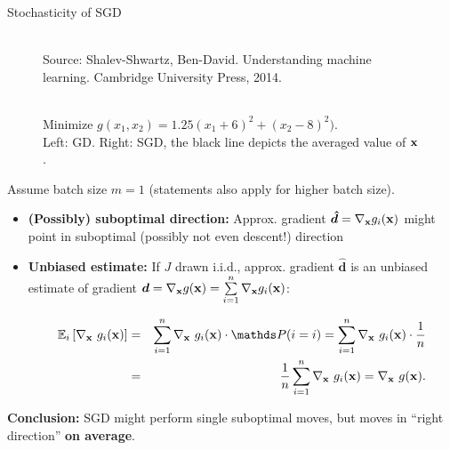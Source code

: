 \documentclass[11pt,compress,t,notes=noshow, xcolor=table]{beamer}
\begin{document}
\begin{vbframe}{Stochasticity of SGD}

	
	\vspace*{0.2cm}

	\begin{figure}
		\begin{tiny}\\ 
		Source: Shalev-Shwartz, Ben-David. Understanding machine learning. Cambridge University Press, 2014. 
		\end{tiny}\\
        Minimize $g(x_1, x_2) = 1.25(x_1 + 6)^2 + (x_2 - 8)^2)$. \\ Left: GD. Right: SGD, the black line depicts the averaged value of $\mathbf{x}$.
	\end{figure}

	\framebreak 

        Assume batch size $m = 1$ (statements also apply for higher batch size).

	\begin{itemize}

		\item \textbf{(Possibly) suboptimal direction: }Approx. gradient $\bm{\hat d} = \nabla_{\mathbf{x}} g_i(\mathbf{x})$ might point in suboptimal (possibly not even descent!) direction
		\item \textbf{Unbiased estimate: } If $J$ drawn i.i.d., approx. gradient $\bm{\hat d}$ is an unbiased estimate of gradient $\bm{d} = \nabla_{\mathbf{x}} g(\mathbf{x}) = \sum\limits_{i=1}^n \nabla_{\mathbf{x}} g_i(\mathbf{x})$: 

		\vspace*{-0.5cm}

		\begin{eqnarray*}
			\mathbb{E}_{i}\left[\nabla_\xv ~g_i(\xv)\right] &=&\sumin \nabla_\xv ~g_i(\xv) \cdot \P(i = i) = \sumin \nabla_\xv ~ g_i(\xv) \cdot \frac{1}{n}\\ &=& \frac{1}{n} \sumin \nabla_\xv~g_i(\xv) = \nabla_\xv~ g(\xv).
		\end{eqnarray*}
	\end{itemize}
\textbf{Conclusion:} SGD might perform single suboptimal moves, but moves in \enquote{right direction} \textbf{on average}. 

\end{vbframe}
\end{document}

